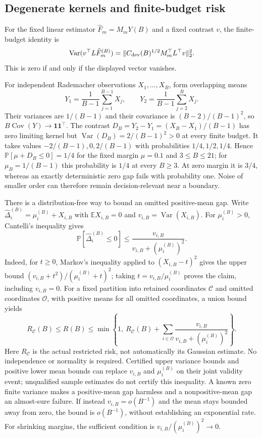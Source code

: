 \documentclass[a4paper,onecolumn,unpublished,nopdfoutputerror]{quantumarticle}
\theoremstyle{plain}
\theoremstyle{definition}
\newcommand{\E}{\mathbb{E}}
\newcommand{\Prob}{\mathbb{P}}
\newcommand{\Var}{\operatorname{Var}}
\newcommand{\Cov}{\operatorname{Cov}}
\newcommand{\calC}{\mathcal{C}}
\newcommand{\1}{\mathbf{1}}
\begin{document}
\subsection{Degenerate kernels and finite-budget risk}
\label{app:finite_budget_degeneracy}
For the fixed linear estimator $\widehat F_m=M_mY(B)$ and a fixed contrast $v$, the finite-budget identity is
\[
\Var(v^\top L\widehat F_m^{(B)})
=\|C_{\rm dev}(B)^{1/2}M_m^\top L^\top v\|_2^2.
\]
This is zero if and only if the displayed vector vanishes.

For independent Rademacher observations $X_1,\ldots,X_B$, form overlapping means
\[
Y_1=\frac1{B-1}\sum_{j=1}^{B-1}X_j,
\qquad Y_2=\frac1{B-1}\sum_{j=2}^{B}X_j.
\]
Their variances are $1/(B-1)$ and their covariance is $(B-2)/(B-1)^2$, so $B\Cov(Y)\to\1\1^\top$. The contrast $D_B=Y_2-Y_1=(X_B-X_1)/(B-1)$ has zero limiting kernel but $\Var(D_B)=2/(B-1)^2>0$ at every finite budget. It takes values $-2/(B-1),0,2/(B-1)$ with probabilities $1/4,1/2,1/4$. Hence $\Prob[\mu+D_B\le0]=1/4$ for the fixed margin $\mu=0.1$ and $3\le B\le21$; for $\mu_B=1/(B-1)$ this probability is $1/4$ at every $B\ge3$. At zero margin it is $3/4$, whereas an exactly deterministic zero gap fails with probability one. Noise of smaller order can therefore remain decision-relevant near a boundary.

There is a distribution-free way to bound an omitted positive-mean gap. Write $\widehat\Delta_i^{(B)}=\mu_i^{(B)}+X_{i,B}$ with $\E X_{i,B}=0$ and $v_{i,B}=\Var(X_{i,B})$. For $\mu_i^{(B)}>0$, Cantelli's inequality gives
\[
\Prob[\widehat\Delta_i^{(B)}\le0]\le
\frac{v_{i,B}}{v_{i,B}+(\mu_i^{(B)})^2}.
\]
Indeed, for $t\ge0$, Markov's inequality applied to $(X_{i,B}-t)^2$ gives the upper bound $(v_{i,B}+t^2)/(\mu_i^{(B)}+t)^2$; taking $t=v_{i,B}/\mu_i^{(B)}$ proves the claim, including $v_{i,B}=0$. For a fixed partition into retained coordinates $\calC$ and omitted coordinates $\mathcal{O}$, with positive means for all omitted coordinates, a union bound yields
\begin{equation}\label{eq:omitted_gap_bound}
R_{\calC}(B)\le R(B)\le
\min\left\{1,\ R_{\calC}(B)+\sum_{i\in\mathcal{O}}
\frac{v_{i,B}}{v_{i,B}+(\mu_i^{(B)})^2}\right\}.
\end{equation}
Here $R_{\calC}$ is the actual restricted risk, not automatically its Gaussian estimate. No independence or normality is required. Certified upper variance bounds and positive lower mean bounds can replace $v_{i,B}$ and $\mu_i^{(B)}$ on their joint validity event; unqualified sample estimates do not certify this inequality. A known zero finite variance makes a positive-mean gap harmless and a nonpositive-mean gap an almost-sure failure. If instead $v_{i,B}=o(B^{-1})$ and the mean stays bounded away from zero, the bound is $o(B^{-1})$, without establishing an exponential rate. For shrinking margins, the sufficient condition is $v_{i,B}/(\mu_i^{(B)})^2\to0$.
\end{document}
